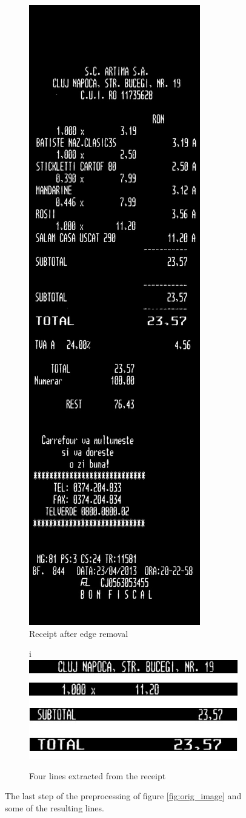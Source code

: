 \begin{figure}
\ContinuedFloat 
\centering
\begin{subfigure}{0.49\linewidth}
  \centering
  \includegraphics[width=.4\linewidth]{img/cleaned.jpg}
  \caption{Receipt after edge removal}
  \label{fig:edge_image}
\end{subfigure}
\begin{subfigure}{0.49\linewidth}
  \centering
i  \includegraphics[width=\linewidth]{img/lines.jpg}
  \caption{Four lines extracted from the receipt}
  \label{fig:line_samples}
\end{subfigure}
\caption{\label{fig:receipts2}
The last step of the preprocessing of figure \ref{fig:orig_image} and some of the resulting lines. }
\end{figure}


